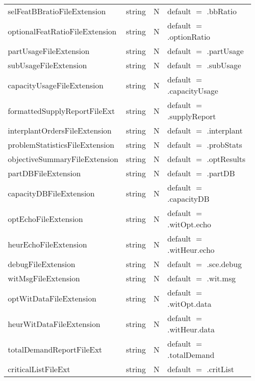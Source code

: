 \begin{tabular}{lllp{3.5in}}
selFeatBBratioFileExtension & string & N & default $=$ .bbRatio \\
optionalFeatRatioFileExtension & string & N & default $=$ .optionRatio \\
partUsageFileExtension & string & N & default $=$ .partUsage \\
subUsageFileExtension & string & N & default $=$ .subUsage \\
capacityUsageFileExtension & string & N & default $=$ .capacityUsage \\
formattedSupplyReportFileExt & string & N & default $=$ .supplyReport \\
interplantOrdersFileExtension & string & N & default $=$ .interplant \\
problemStatisticsFileExtension & string & N & default $=$ .probStats \\
objectiveSummaryFileExtension & string & N & default $=$ .optResults \\
partDBFileExtension & string & N & default $=$ .partDB \\
capacityDBFileExtension & string & N & default $=$ .capacityDB \\
optEchoFileExtension & string & N & default $=$ .witOpt.echo \\
heurEchoFileExtension & string & N & default $=$ .witHeur.echo \\
debugFileExtension & string & N & default $=$ .sce.debug \\
witMsgFileExtension & string & N & default $=$ .wit.msg \\
optWitDataFileExtension & string & N & default $=$ .witOpt.data \\
heurWitDataFileExtension & string & N & default $=$ .witHeur.data \\
totalDemandReportFileExt & string & N & default $=$ .totalDemand \\
criticalListFileExt & string & N & default $=$ .critList
\end{tabular}


